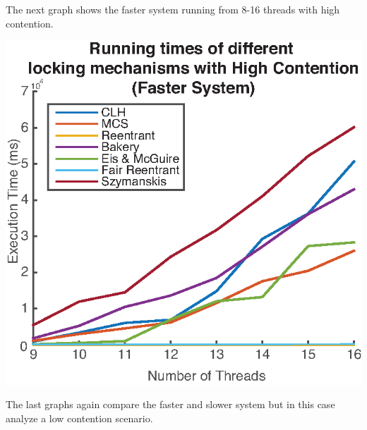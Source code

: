 \documentclass[FinalReport.tex]{subfiles}
\begin{document}
\bigskip

The next graph shows the faster system running from 8-16 threads with high contention.


\bigskip
	
	\begin{center}
	\includegraphics[scale = .8]{myComp_8-16_1000.eps}
	\end{center}	


\bigskip

The last graphs again compare the faster and slower system but in this case analyze a low contention scenario.

\bigskip
\end{document}
